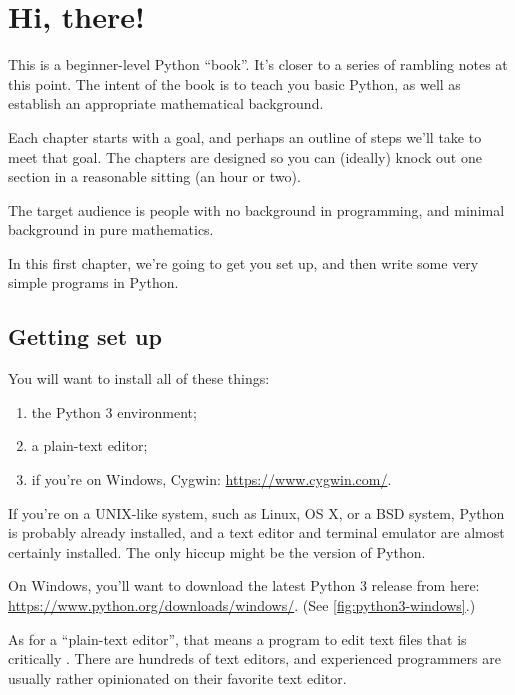 \chapter{Hi, there!}

This is a beginner-level Python ``book''. It's closer to a series of
rambling notes at this point. The intent of the book is to teach you
basic Python, as well as establish an appropriate mathematical
background.

Each chapter starts with a goal, and perhaps an outline of steps we'll
take to meet that goal. The chapters are designed so you can (ideally)
knock out one section in a reasonable sitting (an hour or two).

The target audience is people with no background in programming, and
minimal background in pure mathematics.

In this first chapter, we're going to get you set up, and then write
some very simple programs in Python.

\section{Getting set up}

You will want to install all of these things:

\begin{enumerate}
\item the Python 3 environment;
\item a plain-text editor;
\item if you're on Windows, Cygwin: \url{https://www.cygwin.com/}.
\end{enumerate}

If you're on a UNIX-like system, such as Linux, OS X, or a BSD system,
Python is probably already installed, and a text editor and terminal
emulator are almost certainly installed. The only hiccup might be the
version of Python.

On Windows, you'll want to download the latest Python 3 release from
here: \url{https://www.python.org/downloads/windows/}. (See
\cref{fig:python3-windows}.)

As for a ``plain-text editor'', that means a program to edit text
files that is critically . There are
hundreds of text editors, and experienced programmers are usually
rather opinionated on their favorite text editor.

